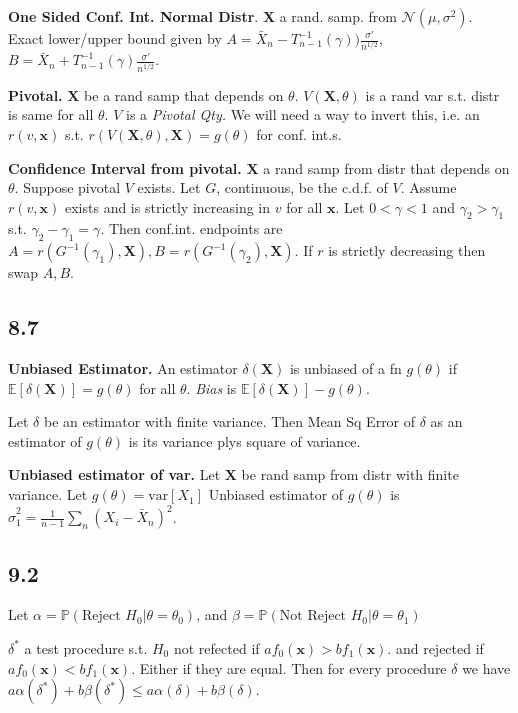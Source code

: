 \documentclass{article}
\renewcommand{\P}[1]{\mathbb{P}\left(#1\right)}
\newcommand{\E}[1]{\mathbb{E}\left[#1\right]}
\newcommand{\var}[1]{\text{var}\left[#1\right]}
\newcommand{\cdf}{c.d.f. }
\newcommand{\norm}[2]{\mathcal{N}(#1, #2)}
\begin{document}
\textbf{One Sided Conf. Int. Normal Distr}.
$\bm{X}$ a rand. samp. from $\norm{\mu}{\sigma^2}$. Exact lower/upper bound given by
$A = \bar{X}_n - T^{-1}_{n-1}(\gamma))\frac{\sigma'}{n^{1/2}}$,
$B = \bar{X}_n + T^{-1}_{n-1}(\gamma)\frac{\sigma'}{n^{1/2}}$.

\textbf{Pivotal.}
$\bm{X}$ be a rand samp that depends on $\theta$. $V(\bm{X}, \theta)$ is a
rand var s.t. distr is same for all $\theta$. $V$ is a \textit{Pivotal Qty.}
We will need a way to invert this, i.e. an $r(v, \bm{x})$ s.t.
$r(V(\bm{X}, \theta), \bm{X}) = g(\theta)$ for conf. int.s.

\textbf{Confidence Interval from pivotal.}
$\bm{X}$ a rand samp from distr that depends on $\theta$. Suppose pivotal $V$ exists.
Let $G$, continuous, be the \cdf of $V$. Assume $r(v, \bm{x})$ exists and is strictly
increasing in $v$ for all $\bm{x}$. Let $0 < \gamma < 1$ and
$\gamma_2 > \gamma_1$ s.t. $\gamma_2 - \gamma_1 = \gamma$. Then conf.int. endpoints
are $A = r(G^{-1}(\gamma_1), \bm{X}), B = r(G^{-1}(\gamma_2), \bm{X})$. If $r$ is
strictly decreasing then swap $A, B$.

\subsection*{8.7}
\textbf{Unbiased Estimator.}
An estimator $\delta(\bm{X})$ is unbiased of a fn $g(\theta)$ if
$\E{\delta(\bm{X})} = g(\theta)$ for all $\theta$. \textit{Bias} is
$\E{\delta(\bm{X})} - g(\theta)$.

Let $\delta$ be an estimator with finite variance. Then Mean Sq Error of $\delta$
as an estimator of $g(\theta)$ is its variance plys square of variance.

\textbf{Unbiased estimator of var.}
Let $\bm{X}$ be rand samp from distr with finite variance.
Let $g(\theta) = \var{X_1}$ Unbiased estimator of $g(\theta)$ is
$\hat{\sigma}_1^2= \frac{1}{n-1}\sum_n (X_i - \bar{X}_n)^2$.

\subsection*{9.2}
Let $\alpha = \P{\text{Reject } H_0 | \theta = \theta_0}$, and 
 $\beta = \P{\text{Not Reject } H_0 | \theta = \theta_1}$

$\delta^*$ a test procedure s.t. $H_0$ not refected if $af_0(\bm{x}) > bf_1(\bm{x})$.
and rejected if $af_0(\bm{x}) < bf_1(\bm{x})$. Either if they are equal. Then for 
every procedure $\delta$ we have 
$a\alpha(\delta^*) + b\beta(\delta^*) \leq a\alpha(\delta) + b\beta(\delta)$.
\end{document}
